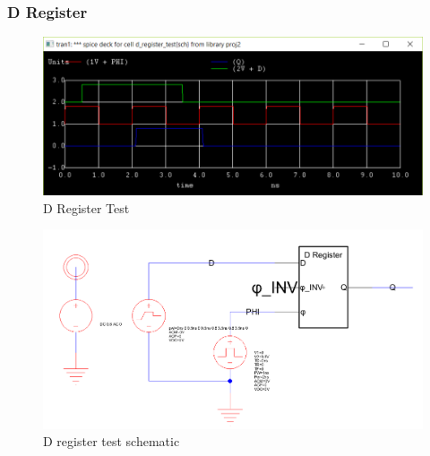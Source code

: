 \documentclass[12pt]{report}
\begin{document}
\subsubsection*{D Register}
\begin{figure}[H]
  \centering
    \includegraphics[width=1.0\textwidth]{d_register_test.PNG}
  \caption{D Register Test}
  \label{fig:d_register_test}
\end{figure}
\begin{figure}[H]
  \centering
    \includegraphics[width=1.0\textwidth]{TestSchematics/d_register.PNG}
  \caption{D register test schematic}
\end{figure}
\end{document}
